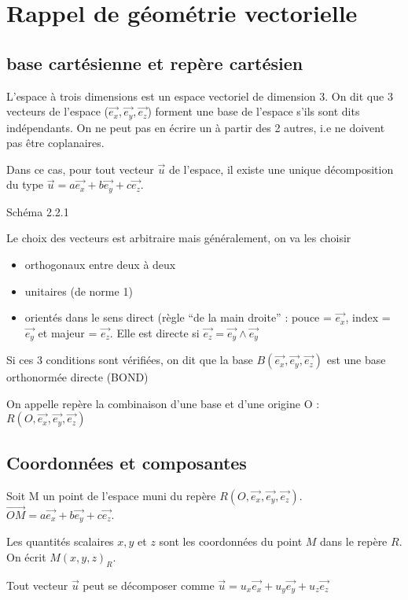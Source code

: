 \documentclass[french]{yLectureNote}
\renewcommand{\vec}{\overrightarrow}
\begin{document}
\section{Rappel de géométrie vectorielle}
\subsection{base cartésienne et repère cartésien}
L'espace à trois dimensions est un espace vectoriel de dimension 3. On dit que 3 vecteurs de l'espace ($\vec{e_x}, \vec{e_y},\vec{e_z}$) forment une base de l'espace s'ils sont dits indépendants. On ne peut pas en écrire un à partir des 2 autres, i.e ne doivent pas \^etre coplanaires.

Dans ce cas, pour tout vecteur $\vec{u}$ de l'espace, il existe une unique décomposition du type $\vec{u} = a\vec{e_x}+ b\vec{e_y}+c\vec{e_z}$.

Schéma 2.2.1

Le choix des vecteurs est arbitraire mais généralement, on va les choisir
\begin{itemize}
 \item orthogonaux entre deux à deux
 \item unitaires (de norme 1)
 \item orientés dans le sens direct (règle ``de la main droite'' : pouce = $\vec{e_x}$, index = $\vec{e_y}$ et majeur = $\vec{e_z}$. Elle est directe si $\vec{e_z} = \vec{e_y} \wedge \vec{e_y}$
\end{itemize}

Si ces 3 conditions sont vérifiées, on dit que la base $B(\vec{e_x}, \vec{e_y},\vec{e_z})$ est une base orthonormée directe (BOND)

\begin{theorem}[Définition]
On appelle repère la combinaison d'une base et d'une origine O : $R(O,\vec{e_x}, \vec{e_y},\vec{e_z})$
\end{theorem}
\subsection{Coordonnées et composantes}
Soit M un point de l'espace muni du repère $R(O,\vec{e_x}, \vec{e_y},\vec{e_z})$. $\vec{OM} = a\vec{e_x}+ b\vec{e_y}+c\vec{e_z}$.

Les quantités scalaires $x,y$ et $z$ sont les coordonnées du point $M$ dans le repère $R$. On écrit $M(x,y,z)_R$.

Tout vecteur $\vec{u}$ peut se décomposer comme $\vec{u} = u_x\vec{e_x}+ u_y\vec{e_y}+u_z\vec{e_z}$
\end{document}
